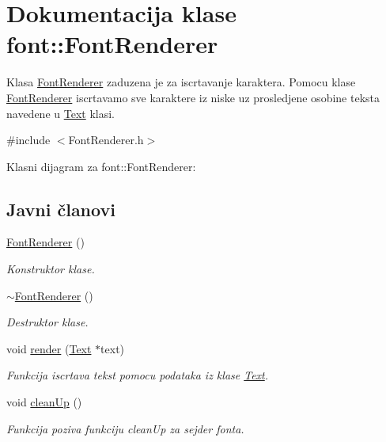 \hypertarget{classfont_1_1FontRenderer}{}\section{Dokumentacija klase font\+:\+:Font\+Renderer}
\label{classfont_1_1FontRenderer}


Klasa \hyperlink{classfont_1_1FontRenderer}{Font\+Renderer} zaduzena je za iscrtavanje karaktera. Pomocu klase \hyperlink{classfont_1_1FontRenderer}{Font\+Renderer} iscrtavamo sve karaktere iz niske uz prosledjene osobine teksta navedene u \hyperlink{classfont_1_1Text}{Text} klasi.  




{\ttfamily \#include $<$Font\+Renderer.\+h$>$}



Klasni dijagram za font\+:\+:Font\+Renderer\+:
\subsection*{Javni članovi}
\begin{DoxyCompactItemize}
\item 
\hyperlink{classfont_1_1FontRenderer_a272ad655371b8a90e2ae76d03b578a21}{Font\+Renderer} ()
\begin{DoxyCompactList}\small\item\em Konstruktor klase. \end{DoxyCompactList}\item 
\hyperlink{classfont_1_1FontRenderer_adc2bcaedb1eac4421e42b264d186c1bb}{$\sim$\+Font\+Renderer} ()
\begin{DoxyCompactList}\small\item\em Destruktor klase. \end{DoxyCompactList}\item 
void \hyperlink{classfont_1_1FontRenderer_adc45aa765d978d8b445c7e8f2eb5c90a}{render} (\hyperlink{classfont_1_1Text}{Text} $\ast$text)
\begin{DoxyCompactList}\small\item\em Funkcija iscrtava tekst pomocu podataka iz klase \hyperlink{classfont_1_1Text}{Text}. \end{DoxyCompactList}\item 
void \hyperlink{classfont_1_1FontRenderer_ae35691cc191fad294054df6e87cde119}{clean\+Up} ()
\begin{DoxyCompactList}\small\item\em Funkcija poziva funkciju clean\+Up za sejder fonta. \end{DoxyCompactList}\end{DoxyCompactItemize}
